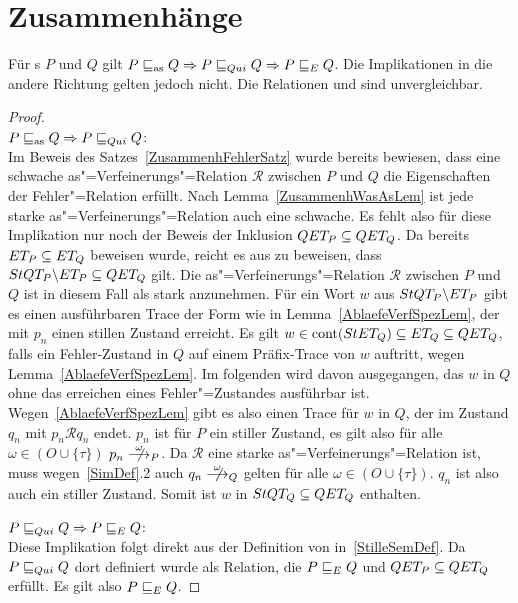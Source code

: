 \section{Zusammenhänge}

\begin{Satz}
  \label{ZusammenhStilleSatz}
  Für \MEIO{}s $P$ und $Q$ gilt $P \sqsubseteq _{\mathrm{as}} Q \Rightarrow P  \sqsubseteq  _{Qui} Q \Rightarrow
  P  \sqsubseteq  _E Q$. Die Implikationen in die andere Richtung gelten jedoch nicht. Die
  Relationen \wasRel{} und \QRel{} sind unvergleichbar.
\end{Satz}
\begin{proof}\mbox{}\\
  $P \sqsubseteq _{\mathrm{as}} Q \Rightarrow P  \sqsubseteq  _{Qui} Q$:\\
  Im Beweis des Satzes~\ref{ZusammenhFehlerSatz} wurde bereits bewiesen, dass
  eine schwache as"=Verfeinerungs"=Relation $\mathcal{R}$ zwischen $P$ und $Q$
  die Eigenschaften der Fehler"=Relation \ERel{} erfüllt. Nach
  Lemma~\ref{ZusammenhWasAsLem} ist jede starke as"=Verfeinerungs"=Relation
  auch eine schwache. Es fehlt also für diese Implikation nur noch der Beweis
  der Inklusion $QET _P \subseteq QET _Q$. Da bereits $ET _P\subseteq ET
  _Q$ beweisen wurde, reicht es aus zu beweisen, dass $StQT _P \backslash ET
  _P\subseteq QET _Q$ gilt. Die as"=Verfeinerungs"=Relation $\mathcal{R}$
  zwischen $P$ und $Q$ ist in diesem Fall als stark anzunehmen. Für ein Wort
  $w$ aus $StQT _P \backslash ET _P$ gibt es einen ausführbaren Trace der
  Form wie in Lemma~\ref{AblaefeVerfSpezLem}, der mit $p_n$ einen stillen
  Zustand erreicht. Es gilt $w\in\mathrm{cont} (StET _Q) \subseteq ET _Q\subseteq QET
  _Q$, falls ein Fehler-Zustand in $Q$ auf einem Präfix-Trace von $w$ auftritt,
  wegen Lemma~\ref{AblaefeVerfSpezLem}. Im folgenden wird davon ausgegangen,
  das $w$ in $Q$ ohne das erreichen eines Fehler"=Zustandes ausführbar ist.
  Wegen~\ref{AblaefeVerfSpezLem} gibt es also einen Trace für $w$ in $Q$, der
  im Zustand $q_n$ mit $p_n \mathcal{R} q_n$ endet. $p_n$ ist für $P$ ein
  stiller Zustand, es gilt also für alle $\omega \in (O\cup \{\tau\})$ $p_n
  \nmust[\omega]_P$. Da $\mathcal{R}$ eine starke as"=Verfeinerungs"=Relation
  ist, muss wegen~\ref{SimDef}.2 auch $q_n \nmust[\omega]_Q$ gelten für alle
  $\omega \in (O\cup \{\tau\})$. $q_n$ ist also auch ein stiller Zustand. Somit
  ist $w$ in $StQT _Q\subseteq QET _Q$ enthalten.

  $P  \sqsubseteq  _{Qui} Q \Rightarrow P  \sqsubseteq  _E Q$:\\
  Diese Implikation folgt direkt aus der Definition von \QRel{}
  in~\ref{StilleSemDef}. Da $P  \sqsubseteq  _{Qui} Q$ dort definiert wurde als Relation, die
  $P  \sqsubseteq  _E Q$ und $QET _P \subseteq QET _Q$ erfüllt. Es gilt also $P  \sqsubseteq  _E Q$.


\end{proof}
